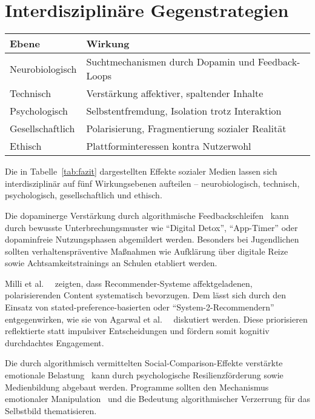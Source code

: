 
\section{Interdisziplinäre Gegenstrategien}\label{sec:interdisziplinaere-gegenstrategien}
\begin{table*}[!t]
    \begin{tabular}{ll}
        \toprule
        \textbf{Ebene} & \textbf{Wirkung} \\
        \midrule
        Neurobiologisch & Suchtmechanismen durch Dopamin und Feedback-Loops \\
        Technisch & Verstärkung affektiver, spaltender Inhalte \\
        Psychologisch & Selbstentfremdung, Isolation trotz Interaktion \\
        Gesellschaftlich & Polarisierung, Fragmentierung sozialer Realität \\
        Ethisch & Plattforminteressen kontra Nutzerwohl \\
        \bottomrule
    \end{tabular}
    \caption{Übersicht der Wirkung von Social Media Algorithmen in verschiedenen Disziplnen}
    \label{tab:fazit}
\end{table*}

Die in Tabelle~\ref{tab:fazit} dargestellten Effekte sozialer Medien lassen sich interdisziplinär auf fünf Wirkungsebenen
aufteilen – neurobiologisch, technisch, psychologisch, gesellschaftlich und ethisch.

Die dopaminerge Verstärkung durch algorithmische Feedbackschleifen~\cite{de_social_nodate} kann durch bewusste
Unterbrechungsmuster wie \enquote{Digital Detox}, \enquote{App-Timer} oder dopaminfreie Nutzungsphasen abgemildert werden.
Besonders bei Jugendlichen sollten verhaltenspräventive Maßnahmen wie Aufklärung über digitale Reize sowie
Achtsamkeitstrainings an Schulen etabliert werden.

Milli et al.\ ~\cite{milli_engagement_2024} zeigten, dass Recommender-Systeme affektgeladenen, polarisierenden Content
systematisch bevorzugen.
Dem lässt sich durch den Einsatz von stated-preference-basierten oder \enquote{System-2-Recommendern} entgegenwirken, wie sie
von Agarwal et al.\ ~\cite{agarwal_system-2_2024} diskutiert werden. 
Diese priorisieren reflektierte statt impulsiver Entscheidungen und fördern somit kognitiv durchdachtes Engagement.

Die durch algorithmisch vermittelten Social-Comparison-Effekte verstärkte emotionale Belastung~\cite{santini_social_2024}
kann durch psychologische Resilienzförderung sowie Medienbildung abgebaut werden.
Programme sollten den Mechanismus emotionaler Manipulation~\cite{doi:10.1073/pnas.1320040111} und die Bedeutung algorithmischer
Verzerrung für das Selbstbild thematisieren.

